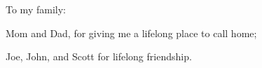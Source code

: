 \vspace*{\fill}
{\em {\centering
To my family:

Mom and Dad, for giving me a lifelong place to call home;

Joe, John, and Scott for lifelong friendship.

}}
\vspace*{\fill}



